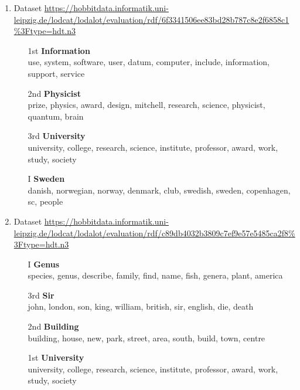 \begin{enumerate}
\item Dataset \url{https://hobbitdata.informatik.uni-leipzig.de/lodcat/lodalot/evaluation/rdf/6f3341506ee83bd28b787c8e2f6858c1%3Ftype=hdt.n3}
\begin{itemize}
\item[1st] \textbf{Information}\\
use, system, software, user, datum, computer, include, information, support, service
\item[2nd] \textbf{Physicist}\\
prize, physics, award,
design, mitchell, research, science, physicist, quantum, brain
\item[3rd] \textbf{University}\\
university, college, research, science, institute, professor, award, work, study, society
\item[I] \textbf{Sweden}\\
danish, norwegian, norway, denmark, club, swedish, sweden, copenhagen, sc, people
\end{itemize}
\vspace{1cm}

\item Dataset \url{https://hobbitdata.informatik.uni-leipzig.de/lodcat/lodalot/evaluation/rdf/c89db4032b3809c7ef9e57e5485ca2f8%3Ftype=hdt.n3}
\begin{itemize}
\item[I] \textbf{Genus}\\
species, genus,
describe, family, find, name, fish, genera, plant, america
\item[3rd] \textbf{Sir}\\
john, london, son, king, william, british, sir,
english, die, death
\item[2nd] \textbf{Building}\\
building, house, new, park, street, area, south, build, town, centre
\item[1st] \textbf{University}\\ 
university, college, research, science, institute, professor, award, work, study, society
\end{itemize}
\vspace{1cm}


\end{enumerate}
